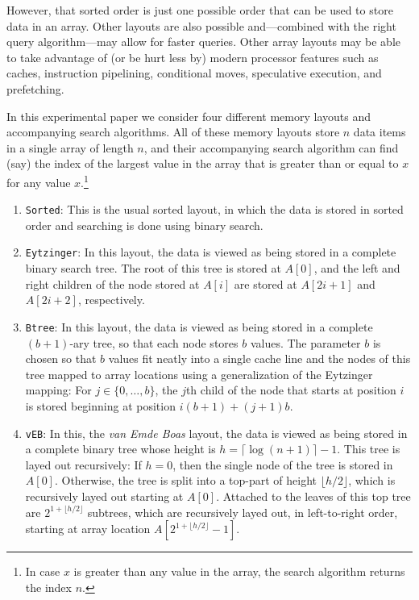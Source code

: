 \documentclass{patmorin}
\begin{document}
However, that sorted order is just one possible order that can be used to
store data in an array. Other layouts are also possible and---combined
with the right query algorithm---may allow for faster queries.
Other array layouts may be able to take advantage of (or be hurt less
by) modern processor features such as caches, instruction pipelining,
conditional moves, speculative execution, and prefetching.

In this experimental paper we consider four different memory layouts and
accompanying search algorithms.  All of these memory layouts store $n$
data items in a single array of length $n$, and their accompanying search
algorithm can find (say) the index of the largest value in the array that
is greater than or equal to $x$ for any value $x$.\footnote{In case $x$
is greater than any value in the array, the search algorithm returns
the index $n$.}

\begin{enumerate}
  \item \texttt{Sorted}:  This is the usual sorted layout, in which
  the data is stored in sorted order and searching is done using binary
  search.

  \item \texttt{Eytzinger}: In this layout, the data is viewed as being
  stored in a complete binary search tree.  The root of this tree is
  stored at $A[0]$, and the left and right children of the node stored
  at $A[i]$ are stored at $A[2i+1]$ and $A[2i+2]$, respectively.

  \item \texttt{Btree}: In this layout, the data is viewed as being stored
  in a complete $(b+1)$-ary tree, so that each node stores $b$ values.
  The parameter $b$ is chosen so that $b$ values fit neatly into a single
  cache line and the nodes of this tree mapped to array locations using
  a generalization of the Eytzinger mapping:  For $j\in \{0,\ldots,b\}$,
  the $j$th child of the node that starts at position $i$ is stored
  beginning at position $i(b+1)+(j+1)b$.

  \item \texttt{vEB}: In this, the \emph{van Emde Boas} layout, the data
  is viewed as being stored in a complete binary tree whose height is
  $h=\lceil\log (n+1)\rceil -1$. This tree is layed out recursively:  If
  $h=0$, then the single node of the tree is stored in $A[0]$.  Otherwise,
  the tree is split into a top-part of height $\lfloor h/2\rfloor$,
  which is recursively layed out starting at $A[0]$.  Attached to the
  leaves of this top tree are $2^{1+\lfloor{h/2\rfloor}}$ subtrees,
  which are recursively layed out, in left-to-right order, starting at
  array location $A[2^{1+\lfloor{h/2\rfloor}}-1]$.
\end{enumerate}
\end{document}
